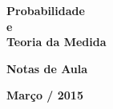 %
%
%
\begin{titlepage}			%

\begin{center}				%

	{\fontsize{16mm}{11mm}
		\selectfont
		\textbf{Probabilidade} 
		\\[0.3cm]
		\textbf{e}
		\\[0.3cm] 
		\textbf{Teoria da Medida} 
		}

	\vspace{60mm}				%


	{\fontsize{14pt}{14pt}\selectfont
		\textbf{Notas de Aula}
		}
	
	\vspace{7pt}				%


	{\fontsize{14pt}{14pt}\selectfont
		\textbf{Março / 2015}
		}
	
	\vfill						%


	\vspace{10mm}				%
	\begin{figure}[h]            %
		\centering
	\end{figure} 

\end{center}
\end{titlepage}
